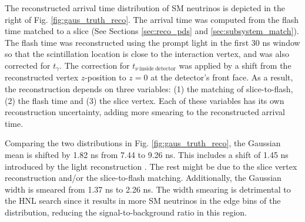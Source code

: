 The reconstructed arrival time distribution of SM neutrinos is depicted in the right of Fig. \ref{fig:gaus_truth_reco}.
The arrival time was computed from the flash time matched to a slice (See Sections \ref{sec:reco_pds} and \ref{sec:subsystem_match}).
The flash time was reconstructed using the prompt light in the first 30 ns window so that the scintillation location is close to the interaction vertex, and was also corrected for $t_{\gamma}$. 
The correction for $t_{\nu\ \mathrm{inside\ detector}}$ was applied by a shift from the reconstructed vertex $z$-position to $z = 0$ at the detector's front face.
As a result, the reconstruction depends on three variables: (1) the matching of slice-to-flash, (2) the flash time and (3) the slice vertex.
Each of these variables has its own reconstruction uncertainty, adding more smearing to the reconstructed arrival time.


Comparing the two distributions in Fig. \ref{fig:gaus_truth_reco}, the Gaussian mean is shifted by 1.82 ns from 7.44 to 9.26 ns.
This includes a shift of 1.45 ns introduced by the light reconstruction \cite{sbnd_pds_paper}.
The rest might be due to the slice vertex reconstruction and/or the slice-to-flash matching.      
Additionally, the Gaussian width is smeared from 1.37 ns to 2.26 ns. 
The width smearing is detrimental to the HNL search since it results in more SM neutrinos in the edge bins of the distribution, reducing the signal-to-background ratio in this region.  

